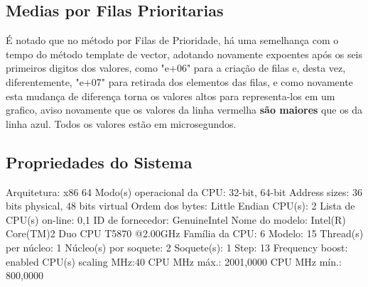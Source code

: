 \documentclass{article}
\begin{document}
\pagebreak
\begin{center}
\section{Medias por Filas Prioritarias}
\end{center}
É notado que no método por Filas de Prioridade, há uma semelhança com o tempo do método template de vector, adotando novamente expoentes após os seis primeiros digitos dos valores, como "e+06" para a criação de filas e, desta vez, diferentemente, "e+07" para retirada dos elementos das filas, e como novamente esta mudança de diferença torna os valores altos para representa-los em um grafico, aviso novamente que os valores da linha vermelha \textbf{são maiores} que os da linha azul. Todos os valores estão em microsegundos.
\begin{center}
\section{Propriedades do Sistema}
\end{center}
Arquitetura: x86 64
Modo(s) operacional da CPU: 32-bit, 64-bit
Address sizes: 36 bits physical, 48 bits virtual
Ordem dos bytes: Little Endian
CPU(s): 2
Lista de CPU(s) on-line: 0,1
ID de fornecedor: GenuineIntel
Nome do modelo: Intel(R) Core(TM)2 Duo CPU     T5870  @2.00GHz
Família da CPU: 6
Modelo: 15
Thread(s) per núcleo: 1
Núcleo(s) por soquete: 2
Soquete(s): 1
Step: 13
Frequency boost: enabled
CPU(s) scaling MHz:40%
CPU MHz máx.: 2001,0000
CPU MHz mín.: 800,0000
\end{document}
